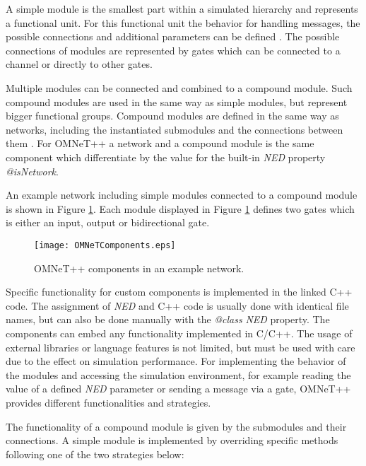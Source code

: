 A simple module is the smallest part within a simulated hierarchy and represents a functional unit.
For this functional unit the behavior for handling messages, the possible connections and additional parameters can be defined \cite[section 3.3]{omnet_manual}.
The possible connections of modules are represented by gates which can be connected to a channel or directly to other gates.

Multiple modules can be connected and combined to a compound module.
Such compound modules are used in the same way as simple modules, but represent bigger functional groups.
Compound modules are defined in the same way as networks, including the instantiated submodules and the connections between them \cite[section 3.4]{omnet_manual}.
For OMNeT++ a network and a compound module is the same component which differentiate by the value for the built-in \emph{NED} property \emph{@isNetwork}.

An example network including simple modules connected to a compound module is shown in Figure \ref{fig:OMNeTComponents}.
Each module displayed in Figure \ref{fig:OMNeTComponents} defines two gates which is either an input, output or bidirectional gate.

\begin{figure}
    \centering
    \texttt{[image: OMNeTComponents.eps]}
    \caption{OMNeT++ components in an example network.}
    \label{fig:OMNeTComponents}
\end{figure}

Specific functionality for custom components is implemented in the linked C++ code.
The assignment of \emph{NED} and C++ code is usually done with identical file names, but can also be done manually with the \emph{@class} \emph{NED} property.
The components can embed any functionality implemented in C/C++.
The usage of external libraries or language features is not limited, but must be used with care due to the effect on simulation performance.
For implementing the behavior of the modules and accessing the simulation environment, for example reading the value of a defined \emph{NED} parameter or sending a message via a gate, 
OMNeT++ provides different functionalities and strategies.

The functionality of a compound module is given by the submodules and their connections.
A simple module is implemented by overriding specific methods following one of the two strategies below:

